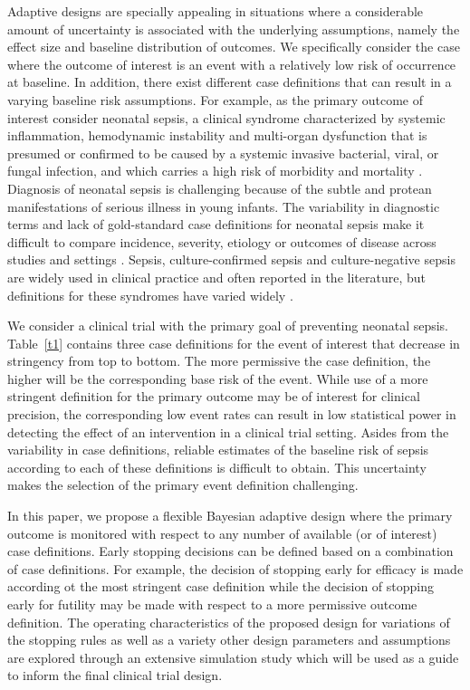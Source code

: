 \documentclass[12pt]{article}
\begin{document}
Adaptive designs are specially appealing in situations where a considerable amount of uncertainty is associated with the underlying assumptions, namely the effect size and baseline distribution of outcomes. We specifically consider the case where the outcome of interest is an event with a relatively low risk of occurrence at baseline. In addition, there exist different case definitions that can result in a varying baseline risk assumptions. For example, as the primary outcome of interest consider neonatal sepsis, a clinical syndrome characterized by systemic inflammation, hemodynamic instability and multi-organ dysfunction that is presumed or confirmed to be caused by a systemic invasive bacterial, viral, or fungal infection, and which carries a high risk of morbidity and
mortality \citep{ShaSanSto17, Wyn16}. Diagnosis of neonatal sepsis is challenging because of the subtle and protean manifestations of
serious illness in young infants.  The variability in diagnostic terms and lack of gold-standard case definitions for neonatal sepsis make it difficult to compare incidence, severity, etiology or outcomes of disease across studies
and settings \citep{SinDeuSey16}. Sepsis, culture-confirmed sepsis and culture-negative sepsis are widely used in clinical practice and often reported in the literature, but definitions for these syndromes have varied widely \citep{ShaSanSto17, Wyn16, VerButCai16, VerSeaFit2017}. 

We consider a clinical trial with the primary goal of preventing neonatal sepsis. Table~\ref{t1} contains three case definitions for the event of interest  that decrease in stringency from top to bottom. The more permissive the case definition, the higher will be the corresponding base risk of the event. While use of a more stringent definition for the primary outcome may be of interest for clinical precision, the corresponding low event rates can result in low statistical power in detecting the effect of an intervention in a clinical trial setting. Asides from the variability in case definitions, reliable estimates of the baseline risk of sepsis according to each of these definitions is difficult to obtain. This uncertainty makes the selection of the primary event definition challenging.

In this paper, we propose a flexible Bayesian adaptive design where the primary outcome is monitored with respect to any number of available (or of interest) case definitions. Early stopping decisions can be defined based on a combination of case definitions. For example, the decision of stopping early for efficacy is made according ot the most stringent case definition while the decision of stopping early for futility may be made with respect to a more permissive outcome definition. The operating characteristics of the proposed design for variations of the stopping rules as well as a variety other design parameters and assumptions are explored through an extensive simulation study which will be used as a guide to inform the final clinical trial design.
\end{document}
